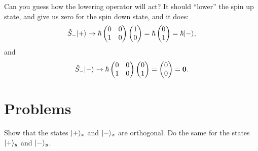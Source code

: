 Can you guess how the lowering operator will act?  It should ``lower'' the spin up state, and give us zero for the spin down state, and it does:
\[
\hat{S}_- | + \rangle \to \hbar \begin{pmatrix} 0 & 0 \\ 1 & 0 \end{pmatrix} \begin{pmatrix} 1 \\ 0 \end{pmatrix} = \hbar \begin{pmatrix} 0 \\ 1 \end{pmatrix} = \hbar | - \rangle,
\]
and
\[
\hat{S}_- | - \rangle \to \hbar \begin{pmatrix} 0 & 0 \\ 1 & 0 \end{pmatrix} \begin{pmatrix} 0 \\ 1 \end{pmatrix} = \begin{pmatrix} 0 \\ 0 \end{pmatrix} = \mathbf{0}.
\]

\section*{Problems}
%

\begin{problem}[Orthogonality]
Show that the states $| + \rangle_x$ and $| - \rangle_x$ are orthogonal.  Do the same for the states $| + \rangle_y$ and $| - \rangle_y$. 
\end{problem}


